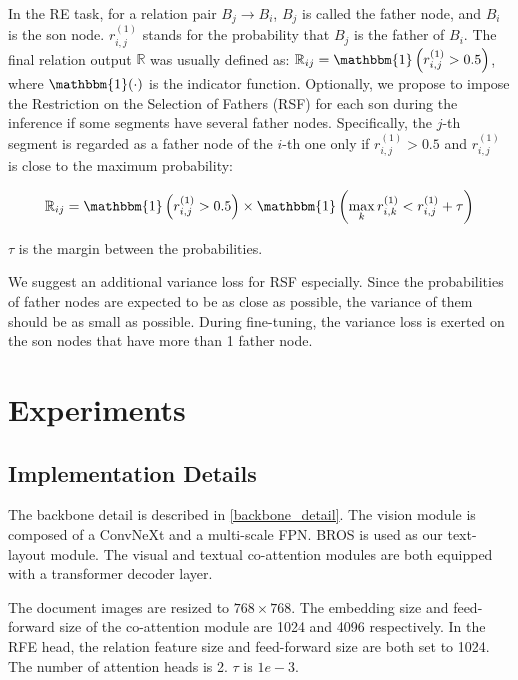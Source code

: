 \documentclass[10pt,twocolumn,letterpaper]{article}
\begin{document}
In the RE task, for a relation pair $B_{j}\to B_{i}$, $B_{j}$ is called the father node, and $B_{i}$ is the son node.
$r_{i,j}^{(1)}$ stands for the probability that $B_{j}$ is the father of $B_{i}$.
The final relation output $\mathbb{R}$ was usually defined as: $\mathbb{R}_{ij}=\mathbbm{1}\left(r_{i,j}^{(1)}>0.5\right)$, where $\mathbbm{1}(\cdot)$ is the indicator function.
Optionally, we propose to impose the Restriction on the Selection of Fathers (RSF) for each son during the inference if some segments have several father nodes.
Specifically, the $j$-th segment is regarded as a father node of the $i$-th one only if $r_{i,j}^{(1)}>0.5$ and $r_{i,j}^{(1)}$ is close to the maximum probability:




\begin{equation}
  \mathbb{R}_{ij}=\mathbbm{1}\left(r_{i,j}^{(1)}>0.5\right)\times \mathbbm{1}\left(\max _k r_{i,k}^{(1)}<r_{i,j}^{(1)}+\tau\right)
  \label{infer_1}
\end{equation}

 $\tau$ is the margin between the probabilities.



We suggest an additional variance loss for RSF especially. Since the probabilities of father nodes are expected to be as close as possible, the variance of them should be as small as possible. During fine-tuning, the variance loss is exerted on the son nodes that have more than 1 father node.


\section{Experiments}
\subsection{Implementation Details}
The backbone detail is described in \cref{backbone_detail}. 
The vision module is composed of a ConvNeXt\cite{liu2022convnet} and a multi-scale FPN\cite{liao2020real}. BROS\cite{hong2022bros} is used as our text-layout module. The visual and textual co-attention modules are both equipped with a transformer decoder layer.

The document images are resized to $768\times 768$. The embedding size and feed-forward size of the co-attention module are 1024 and 4096 respectively.
In the RFE head, the relation feature size and feed-forward size are both set to 1024. The number of attention heads is 2. $\tau$ is $1e-3$.
\end{document}
